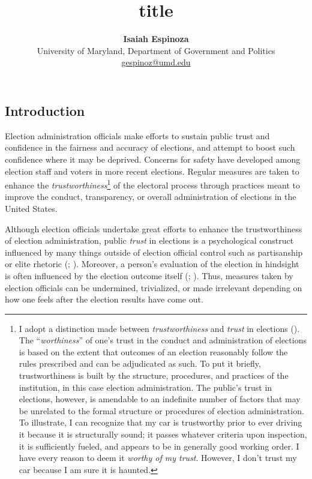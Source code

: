 \documentclass[
  12pt,
  letterpaper,
]{article}
\title{title}
\author{
{\bfseries \normalsize Isaiah Espinoza}%
 \\%
 \small University of Maryland, Department of Government and
Politics \\%
{\footnotesize \url{gespinoz@umd.edu}} \\\vspace{10pt}
}
\date{}
\begin{document}
\renewcommand{\abstractname}{Abstract.}


\maketitle


\pagebreak

\subsection{Introduction}\label{introduction}

Election administration officials make efforts to sustain public trust
and confidence in the fairness and accuracy of elections, and attempt to
boost such confidence where it may be deprived. Concerns for safety have
developed among election staff and voters in more recent elections.
Regular measures are taken to enhance the
\emph{trustworthiness}\footnote{I adopt a distinction made between
  \emph{trustworthiness} and \emph{trust} in elections
  (). The ``\emph{worthiness}''
  of one's trust in the conduct and administration of elections is based
  on the extent that outcomes of an election reasonably follow the rules
  prescribed and can be adjudicated as such. To put it briefly,
  trustworthiness is built by the structure, procedures, and practices
  of the institution, in this case election administration. The public's
  trust in elections, however, is amendable to an indefinite number of
  factors that may be unrelated to the formal structure or procedures of
  election administration. To illustrate, I can recognize that my car is
  trustworthy prior to ever driving it because it is structurally sound;
  it passes whatever criteria upon inspection, it is sufficiently
  fueled, and appears to be in generally good working order. I have
  every reason to deem it \emph{worthy of my trust}. However, I don't
  trust my car because I am sure it is haunted.} of the electoral
process through practices meant to improve the conduct, transparency, or
overall administration of elections in the United States.

Although election officials undertake great efforts to enhance the
trustworthiness of election administration, public \emph{trust} in
elections is a psychological construct influenced by many things outside
of election official control such as partisanship or elite rhetoric
(;
). Moreover, a
person's evaluation of the election in hindsight is often influenced by
the election outcome itself (; ). Thus, measures
taken by election officials can be undermined, trivialized, or made
irrelevant depending on how one feels after the election results have
come out.
\end{document}
